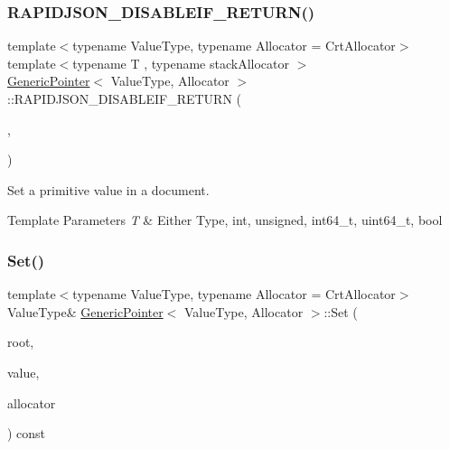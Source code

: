 \subsubsection{\texorpdfstring{R\+A\+P\+I\+D\+J\+S\+O\+N\+\_\+\+D\+I\+S\+A\+B\+L\+E\+I\+F\+\_\+\+R\+E\+T\+U\+R\+N()}{RAPIDJSON\_DISABLEIF\_RETURN()}\hspace{0.1cm}{\footnotesize\ttfamily [3/3]}}
{\footnotesize\ttfamily template$<$typename Value\+Type, typename Allocator = Crt\+Allocator$>$ \\
template$<$typename T , typename stack\+Allocator $>$ \\
\hyperlink{classGenericPointer}{Generic\+Pointer}$<$ Value\+Type, Allocator $>$\+::R\+A\+P\+I\+D\+J\+S\+O\+N\+\_\+\+D\+I\+S\+A\+B\+L\+E\+I\+F\+\_\+\+R\+E\+T\+U\+RN (\begin{DoxyParamCaption}\item[{(internal\+::\+Or\+Expr$<$ internal\+::\+Is\+Pointer$<$ T $>$, \hyperlink{structinternal_1_1IsGenericValue}{internal\+::\+Is\+Generic\+Value}$<$ T $>$ $>$)}]{,  }\item[{(Value\+Type \&)}]{ }\end{DoxyParamCaption})}



Set a primitive value in a document. 


\begin{DoxyTemplParams}{Template Parameters}
{\em T} & Either Type, {\ttfamily int}, {\ttfamily unsigned}, {\ttfamily int64\+\_\+t}, {\ttfamily uint64\+\_\+t}, {\ttfamily bool} \\
\hline
\end{DoxyTemplParams}
\mbox{\label{classGenericPointer_a71476d125a276b62a246990da1bd3468}} 
\subsubsection{\texorpdfstring{Set()}{Set()}}
{\footnotesize\ttfamily template$<$typename Value\+Type, typename Allocator = Crt\+Allocator$>$ \\
Value\+Type\& \hyperlink{classGenericPointer}{Generic\+Pointer}$<$ Value\+Type, Allocator $>$\+::Set (\begin{DoxyParamCaption}\item[{Value\+Type \&}]{root,  }\item[{Value\+Type \&}]{value,  }\item[{typename Value\+Type\+::\+Allocator\+Type \&}]{allocator }\end{DoxyParamCaption}) const\hspace{0.3cm}{\ttfamily [inline]}}



